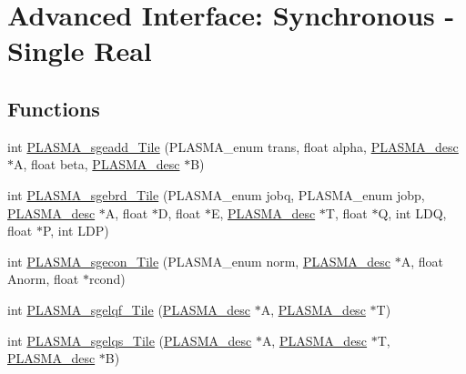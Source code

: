 \hypertarget{group__float__Tile}{}\section{Advanced Interface\+: Synchronous -\/ Single Real}
\label{group__float__Tile}
\subsection*{Functions}
\begin{DoxyCompactItemize}
\item 
int \hyperlink{group__float__Tile_ga87d12ba559572c6fe86af294f5cfb3a3_ga87d12ba559572c6fe86af294f5cfb3a3}{P\+L\+A\+S\+M\+A\+\_\+sgeadd\+\_\+\+Tile} (P\+L\+A\+S\+M\+A\+\_\+enum trans, float alpha, \hyperlink{structplasma__desc__t}{P\+L\+A\+S\+M\+A\+\_\+desc} $\ast$A, float beta, \hyperlink{structplasma__desc__t}{P\+L\+A\+S\+M\+A\+\_\+desc} $\ast$B)
\item 
int \hyperlink{group__float__Tile_gac1da440c28ae9d970489d4523956f3dd_gac1da440c28ae9d970489d4523956f3dd}{P\+L\+A\+S\+M\+A\+\_\+sgebrd\+\_\+\+Tile} (P\+L\+A\+S\+M\+A\+\_\+enum jobq, P\+L\+A\+S\+M\+A\+\_\+enum jobp, \hyperlink{structplasma__desc__t}{P\+L\+A\+S\+M\+A\+\_\+desc} $\ast$A, float $\ast$D, float $\ast$E, \hyperlink{structplasma__desc__t}{P\+L\+A\+S\+M\+A\+\_\+desc} $\ast$T, float $\ast$Q, int L\+D\+Q, float $\ast$P, int L\+D\+P)
\item 
int \hyperlink{group__float__Tile_ga2f84d657dbd1d672faf0251081facaf6_ga2f84d657dbd1d672faf0251081facaf6}{P\+L\+A\+S\+M\+A\+\_\+sgecon\+\_\+\+Tile} (P\+L\+A\+S\+M\+A\+\_\+enum norm, \hyperlink{structplasma__desc__t}{P\+L\+A\+S\+M\+A\+\_\+desc} $\ast$A, float Anorm, float $\ast$rcond)
\item 
int \hyperlink{group__float__Tile_ga4360b93a339b6fff6aa98a6427224395_ga4360b93a339b6fff6aa98a6427224395}{P\+L\+A\+S\+M\+A\+\_\+sgelqf\+\_\+\+Tile} (\hyperlink{structplasma__desc__t}{P\+L\+A\+S\+M\+A\+\_\+desc} $\ast$A, \hyperlink{structplasma__desc__t}{P\+L\+A\+S\+M\+A\+\_\+desc} $\ast$T)
\item 
int \hyperlink{group__float__Tile_ga1b602ea68c4e9eb0fba8f890231b2a57_ga1b602ea68c4e9eb0fba8f890231b2a57}{P\+L\+A\+S\+M\+A\+\_\+sgelqs\+\_\+\+Tile} (\hyperlink{structplasma__desc__t}{P\+L\+A\+S\+M\+A\+\_\+desc} $\ast$A, \hyperlink{structplasma__desc__t}{P\+L\+A\+S\+M\+A\+\_\+desc} $\ast$T, \hyperlink{structplasma__desc__t}{P\+L\+A\+S\+M\+A\+\_\+desc} $\ast$B)

\end{DoxyCompactItemize}
